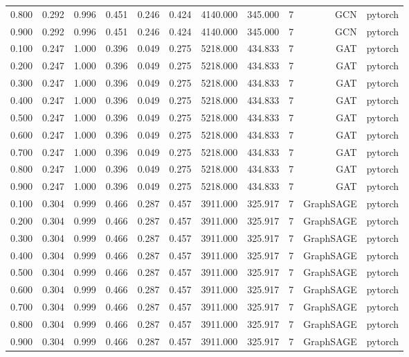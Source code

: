 \begin{tabular}{lrrrrrrrrrr}
0.800 & 0.292 & 0.996 & 0.451 & 0.246 & 0.424 & 4140.000 & 345.000 & 7 & GCN & pytorch \\
0.900 & 0.292 & 0.996 & 0.451 & 0.246 & 0.424 & 4140.000 & 345.000 & 7 & GCN & pytorch \\
0.100 & 0.247 & 1.000 & 0.396 & 0.049 & 0.275 & 5218.000 & 434.833 & 7 & GAT & pytorch \\
0.200 & 0.247 & 1.000 & 0.396 & 0.049 & 0.275 & 5218.000 & 434.833 & 7 & GAT & pytorch \\
0.300 & 0.247 & 1.000 & 0.396 & 0.049 & 0.275 & 5218.000 & 434.833 & 7 & GAT & pytorch \\
0.400 & 0.247 & 1.000 & 0.396 & 0.049 & 0.275 & 5218.000 & 434.833 & 7 & GAT & pytorch \\
0.500 & 0.247 & 1.000 & 0.396 & 0.049 & 0.275 & 5218.000 & 434.833 & 7 & GAT & pytorch \\
0.600 & 0.247 & 1.000 & 0.396 & 0.049 & 0.275 & 5218.000 & 434.833 & 7 & GAT & pytorch \\
0.700 & 0.247 & 1.000 & 0.396 & 0.049 & 0.275 & 5218.000 & 434.833 & 7 & GAT & pytorch \\
0.800 & 0.247 & 1.000 & 0.396 & 0.049 & 0.275 & 5218.000 & 434.833 & 7 & GAT & pytorch \\
0.900 & 0.247 & 1.000 & 0.396 & 0.049 & 0.275 & 5218.000 & 434.833 & 7 & GAT & pytorch \\
0.100 & 0.304 & 0.999 & 0.466 & 0.287 & 0.457 & 3911.000 & 325.917 & 7 & GraphSAGE & pytorch \\
0.200 & 0.304 & 0.999 & 0.466 & 0.287 & 0.457 & 3911.000 & 325.917 & 7 & GraphSAGE & pytorch \\
0.300 & 0.304 & 0.999 & 0.466 & 0.287 & 0.457 & 3911.000 & 325.917 & 7 & GraphSAGE & pytorch \\
0.400 & 0.304 & 0.999 & 0.466 & 0.287 & 0.457 & 3911.000 & 325.917 & 7 & GraphSAGE & pytorch \\
0.500 & 0.304 & 0.999 & 0.466 & 0.287 & 0.457 & 3911.000 & 325.917 & 7 & GraphSAGE & pytorch \\
0.600 & 0.304 & 0.999 & 0.466 & 0.287 & 0.457 & 3911.000 & 325.917 & 7 & GraphSAGE & pytorch \\
0.700 & 0.304 & 0.999 & 0.466 & 0.287 & 0.457 & 3911.000 & 325.917 & 7 & GraphSAGE & pytorch \\
0.800 & 0.304 & 0.999 & 0.466 & 0.287 & 0.457 & 3911.000 & 325.917 & 7 & GraphSAGE & pytorch \\
0.900 & 0.304 & 0.999 & 0.466 & 0.287 & 0.457 & 3911.000 & 325.917 & 7 & GraphSAGE & pytorch \\

\end{tabular}
